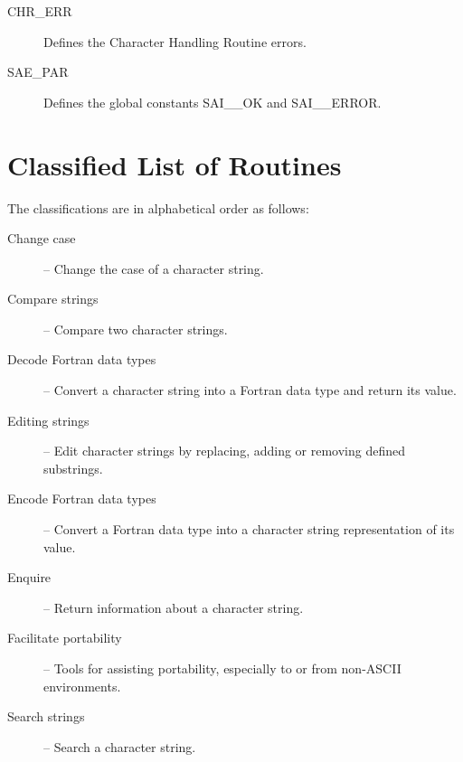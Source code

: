 \documentclass[twoside,11pt,nolof]{starlink}
\begin{document}
\begin {description}
\item [CHR\_ERR] Defines the Character Handling Routine errors.
\item [SAE\_PAR] Defines the global constants SAI\_\_OK and SAI\_\_ERROR.
\end {description}

\newpage
\section {Classified List of Routines \label{class_sect}}

The classifications are in alphabetical order as follows:

\begin{description}
\item[Change case] --
    Change the case of a character string.
\item[Compare strings] --
    Compare two character strings.
\item[Decode Fortran data types] --
    Convert a character string into a Fortran data type and return its
    value.
\item[Editing strings] --
    Edit character strings by replacing, adding or removing defined
    substrings.
\item[Encode Fortran data types] --
    Convert a Fortran data type into a character string representation of
    its value.
\item[Enquire] --
    Return information about a character string.
\item[Facilitate portability] --
    Tools for assisting portability, especially to or from non-ASCII
    environments.
\item[Search strings] --
    Search a character string.
\end{description}
\end{document}
